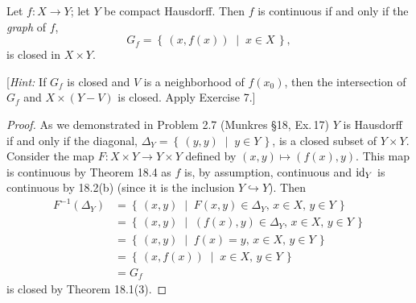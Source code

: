 \begin{problem}[Munkres \S26, Ex.\,8]
\begin{theorem*}
Let $f\colon X\to Y$; let $Y$ be compact Hausdorff. Then $f$ is
continuous if and only if the \emph{graph} of $f$,
\[
G_f=\left\{\,(x,f(x))\;\middle|\;x\in X\,\right\},
\]
is closed in $X\times Y$.
\end{theorem*}
[\emph{Hint:} If $G_f$ is closed and $V$ is a neighborhood of
$f(x_0)$, then the intersection of $G_f$ and $X\times(Y-V)$ is
closed. Apply Exercise 7.]
\end{problem}
\begin{proof}
As we demonstrated in Problem 2.7 (Munkres \S18, Ex.\,17) $Y$ is
Hausdorff if and only if the diagonal,
$\Delta_Y=\left\{\,(y,y)\;\middle|\;y\in Y\,\right\}$, is a closed
subset of $Y\times Y$. Consider the map $F\colon X\times Y\to Y\times
Y$ defined by $(x,y)\mapsto (f(x),y)$. This map is continuous by
Theorem 18.4 as $f$ is, by assumption, continuous and $\operatorname{id}_Y$ is
continuous by 18.2(b) (since it is the inclusion $Y\hookrightarrow
Y$). Then
\begin{align*}
F^{-1}(\Delta_Y)
&=\left\{\,(x,y)\;\middle|\;\text{$F(x,y)\in\Delta_Y$, $x\in X$, $y\in
  Y$}\,\right\}\\
&=\left\{\,(x,y)\;\middle|\;\text{$(f(x),y)\in\Delta_Y$, $x\in X$,
  $y\in Y$}\,\right\}\\
&=\left\{\,(x,y)\;\middle|\;\text{$f(x)=y$, $x\in X$, $y\in Y$}\,\right\}\\
&=\left\{\,(x,f(x))\;\middle|\;\text{$x\in X$, $y\in Y$}\,\right\}\\
&=G_f
\end{align*}
is closed by Theorem 18.1(3).


\end{proof}
